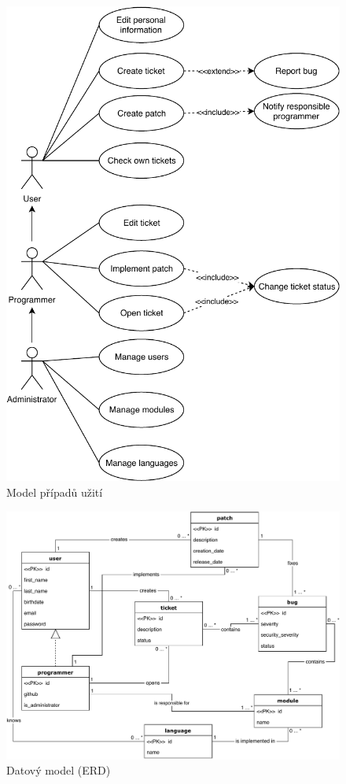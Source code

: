 \documentclass[11pt, a4paper]{article}
\begin{document}
	\begin{figure}[ht]
		\centering
		\vspace{-3cm}
        \includegraphics[width=1 \linewidth]{use_case_diagram.pdf}
		\caption{Model případů užití}
	\end{figure}
	
	\begin{landscape}
    	\begin{figure}[ht]
    		\centering
            \includegraphics[width=0.85 \linewidth]{er_diagram.pdf}
    		\caption{Datový model (ERD)}
    	\end{figure}
	\end{landscape}
\end{document}
